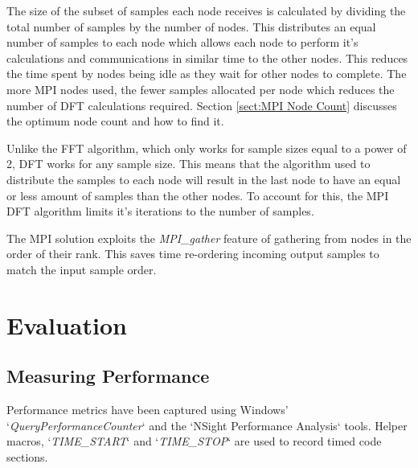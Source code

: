 \documentclass[11pt,a4paper]{article}
\begin{document}
The size of the subset of samples each node receives is calculated by dividing the total number of samples by the number of nodes. This distributes an equal number of samples to each node which allows each node to perform it's calculations and communications in similar time to the other nodes. This reduces the time spent by nodes being idle as they wait for other nodes to complete. The more MPI nodes used, the fewer samples allocated per node which reduces the number of DFT calculations required. Section \ref{sect:MPI Node Count} discusses the optimum node count and how to find it.

\begin{figure}[H]%
    \centering
    \qquad
    \vspace{5pt}
    \caption{}%
    \label{fig:cuda_threads_per_block}%
\end{figure}

Unlike the FFT algorithm, which only works for sample sizes equal to a power of 2, DFT works for any sample size. This means that the algorithm used to distribute the samples to each node will result in the last node to have an equal or less amount of samples than the other nodes. To account for this, the MPI DFT algorithm limits it's iterations to the number of samples. 

The MPI solution exploits the \textit{MPI\_gather} feature of gathering from nodes in the order of their rank. This saves time re-ordering incoming output samples to match the input sample order.


\section{Evaluation}
\subsection{Measuring Performance}
Performance metrics have been captured using Windows' `\textit{QueryPerformanceCounter}` and the `NSight Performance Analysis` tools. Helper macros, `\textit{TIME\_START}` and `\textit{TIME\_STOP}` are used to record timed code sections.
\end{document}
